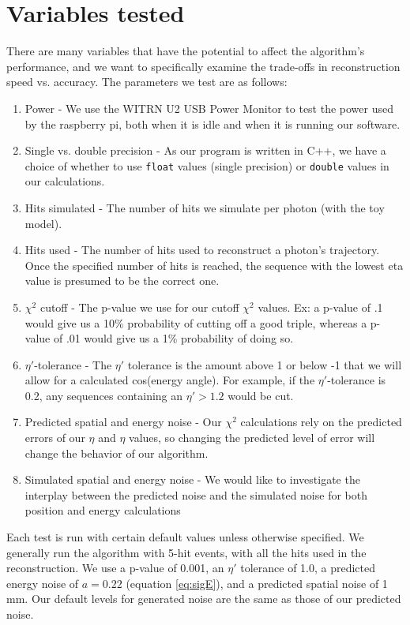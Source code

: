 \section{Variables tested}
There are many variables that have the potential to affect the algorithm's performance, and we want to specifically examine the trade-offs in reconstruction speed vs. accuracy. The parameters we test are as follows:

\begin{enumerate}
    \item Power - We use the WITRN U2 USB Power Monitor to test the power used by the raspberry pi, both when it is idle and when it is running our software.
    \item Single vs. double precision - As our program is written in C++, we have a choice of whether to use \texttt{float} values (single precision) or \texttt{double} values in our calculations.
    \item Hits simulated - The number of hits we simulate per photon (with the toy model).
    \item Hits used - The number of hits used to reconstruct a photon's trajectory. Once the specified number of hits is reached, the sequence with the lowest eta value is presumed to be the correct one.
    \item $\chi^2$ cutoff - The p-value we use for our cutoff $\chi^2$ values. Ex: a p-value of .1 would give us a 10\% probability of cutting off a good triple, whereas a p-value of .01 would give us a 1\% probability of doing so.
    \item $\eta'$-tolerance - The $\eta'$ tolerance is the amount above 1 or below -1 that we will allow for a calculated cos(energy angle). For example, if the $\eta'$-tolerance is 0.2, any sequences containing an $\eta' > 1.2$ would be cut.
    \item Predicted spatial and energy noise - Our $\chi^2$ calculations rely on the predicted errors of our $\eta$ and $\eta$ values, so changing the predicted level of error will change the behavior of our algorithm.
    \item Simulated spatial and energy noise - We would like to investigate the interplay between the predicted noise and the simulated noise for both position and energy calculations
\end{enumerate}

Each test is run with certain default values unless otherwise specified. We generally run the algorithm with 5-hit events, with all the hits used in the reconstruction. We use a p-value of 0.001, an $\eta'$ tolerance of 1.0, a predicted energy noise of $a=0.22$ (equation \ref{eq:sigE}), and a predicted spatial noise of 1 mm. Our default levels for generated noise are the same as those of our predicted noise.